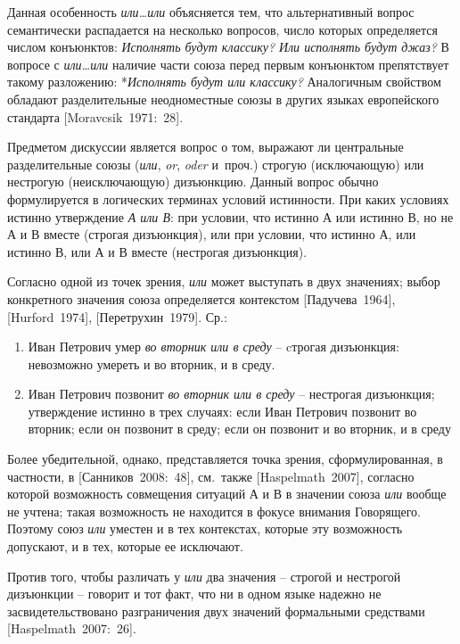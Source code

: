 Данная особенность \emph{или\ldots или} объясняется тем, что
альтернативный вопрос семантически распадается на несколько вопросов,
число которых определяется числом конъюнктов: \emph{Исполнять будут
классику?} \emph{Или исполнять будут джаз?} В вопросе с
\emph{или\ldots или} наличие части союза перед первым конъюнктом
препятствует такому разложению: *\emph{Исполнять будут или классику?}
Аналогичным свойством обладают разделительные неодноместные союзы в
других языках европейского стандарта {[}Moravcsik~1971:~28{]}.

Предметом дискуссии является вопрос о том, выражают ли центральные
разделительные союзы (\emph{или}, \emph{or}, \emph{oder} и~проч.)
строгую (исключающую) или нестрогую (неисключающую) дизъюнкцию. Данный
вопрос обычно формулируется в логических терминах условий истинности.
При каких условиях истинно утверждение \emph{А или В}: при условии, что
истинно А или истинно В, но не А и В вместе (строгая дизъюнкция), или
при условии, что истинно А, или истинно В, или А и В вместе (нестрогая
дизъюнкция).

Согласно одной из точек зрения, \emph{или} может выступать в двух
значениях; выбор конкретного значения союза определяется контекстом
{[}Падучева~1964{]}, {[}Hurford~1974{]}, {[}Перетрухин~1979{]}. Ср.:

\begin{enumerate}
\def\labelenumi{(\arabic{enumi})}
\setcounter{enumi}{173}
\item
  Иван Петрович умер \emph{во вторник или в среду} -- cтрогая
  дизъюнкция: невозможно умереть и во вторник, и в среду.
\item
  Иван Петрович позвонит \emph{во вторник или в среду} -- нестрогая
  дизъюнкция; утверждение истинно в трех случаях: если Иван Петрович
  позвонит во вторник; если он позвонит в среду; если он позвонит и во
  вторник, и в среду
\end{enumerate}

Более убедительной, однако, представляется точка зрения,
сформулированная, в частности, в {[}Санников~2008:~48{]}, см.~также
{[}Haspelmath~2007{]}, согласно которой возможность совмещения ситуаций
А и В в значении союза \emph{или} вообще не учтена; такая возможность не
находится в фокусе внимания Говорящего. Поэтому союз \emph{или} уместен
и в тех контекстах, которые эту возможность допускают, и в тех, которые
ее исключают.

Против того, чтобы различать у \emph{или} два значения -- строгой и
нестрогой дизъюнкции -- говорит и тот факт, что ни в одном языке надежно
не засвидетельствовано разграничения двух значений формальными
средствами {[}Haspelmath~2007:~26{]}.

